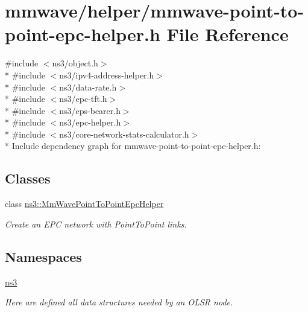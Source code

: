 \hypertarget{mmwave-point-to-point-epc-helper_8h}{}\section{mmwave/helper/mmwave-\/point-\/to-\/point-\/epc-\/helper.h File Reference}
\label{mmwave-point-to-point-epc-helper_8h}
{\ttfamily \#include $<$ns3/object.\+h$>$}\\*
{\ttfamily \#include $<$ns3/ipv4-\/address-\/helper.\+h$>$}\\*
{\ttfamily \#include $<$ns3/data-\/rate.\+h$>$}\\*
{\ttfamily \#include $<$ns3/epc-\/tft.\+h$>$}\\*
{\ttfamily \#include $<$ns3/eps-\/bearer.\+h$>$}\\*
{\ttfamily \#include $<$ns3/epc-\/helper.\+h$>$}\\*
{\ttfamily \#include $<$ns3/core-\/network-\/stats-\/calculator.\+h$>$}\\*
Include dependency graph for mmwave-\/point-\/to-\/point-\/epc-\/helper.h\+:
\subsection*{Classes}
\begin{DoxyCompactItemize}
\item 
class \hyperlink{classns3_1_1MmWavePointToPointEpcHelper}{ns3\+::\+Mm\+Wave\+Point\+To\+Point\+Epc\+Helper}
\begin{DoxyCompactList}\small\item\em Create an E\+PC network with Point\+To\+Point links. \end{DoxyCompactList}\end{DoxyCompactItemize}
\subsection*{Namespaces}
\begin{DoxyCompactItemize}
\item 
 \hyperlink{namespacens3}{ns3}
\begin{DoxyCompactList}\small\item\em Here are defined all data structures needed by an O\+L\+SR node. \end{DoxyCompactList}\end{DoxyCompactItemize}
